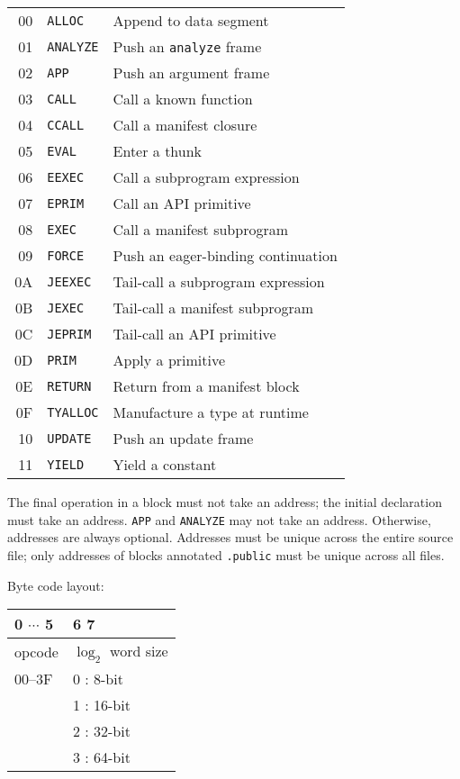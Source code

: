 \documentclass{article}
\begin{document}
\begin{tabular}{rl@{ --- }l}
  00 & \texttt{ALLOC} & Append to data segment \\
  01 & \texttt{ANALYZE} & Push an \texttt{analyze} frame \\
  02 & \texttt{APP} & Push an argument frame \\
  03 & \texttt{CALL} & Call a known function \\
  04 & \texttt{CCALL} & Call a manifest closure \\
  05 & \texttt{EVAL} & Enter a thunk \\
  06 & \texttt{EEXEC} & Call a subprogram expression \\
  07 & \texttt{EPRIM} & Call an API primitive \\
  08 & \texttt{EXEC} & Call a manifest subprogram \\
  09 & \texttt{FORCE} & Push an eager-binding continuation \\
  0A & \texttt{JEEXEC} & Tail-call a subprogram expression \\
  0B & \texttt{JEXEC} & Tail-call a manifest subprogram \\
  0C & \texttt{JEPRIM} & Tail-call an API primitive \\
  0D & \texttt{PRIM} & Apply a primitive \\
  0E & \texttt{RETURN} & Return from a manifest block \\
  0F & \texttt{TYALLOC} & Manufacture a type at runtime \\
  10 & \texttt{UPDATE} & Push an update frame \\
  11 & \texttt{YIELD} & Yield a constant \\
\end{tabular}

The final operation in a block must not take an address; the initial declaration must take an address.
\texttt{APP} and \texttt{ANALYZE} may not take an address.
Otherwise, addresses are always optional.
Addresses must be unique across the entire source file;
only addresses of blocks annotated \texttt{.public} must be unique across all files.

Byte code layout:

\begin{tabular}{|l|l|}
\hline
  0 $\cdots$ 5 & 6 7 \\
\hline
  opcode & $\log_2$ word size \\
  00--3F & 0 : 8-bit \\
  & 1 : 16-bit \\
  & 2 : 32-bit \\
  & 3 : 64-bit \\
\hline
\end{tabular}
\end{document}
